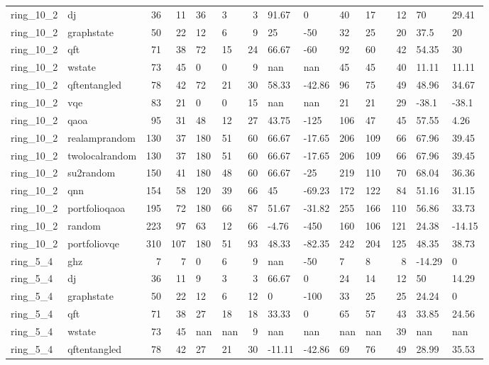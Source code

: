 \begin{longtable}{llrrllrllllrll}
ring\_10\_2 & dj & 36 & 11 & 36 & 3 & 3 & 91.67 & 0 & 40 & 17 & 12 & 70 & 29.41 \\
ring\_10\_2 & graphstate & 50 & 22 & 12 & 6 & 9 & 25 & -50 & 32 & 25 & 20 & 37.5 & 20 \\
ring\_10\_2 & qft & 71 & 38 & 72 & 15 & 24 & 66.67 & -60 & 92 & 60 & 42 & 54.35 & 30 \\
ring\_10\_2 & wstate & 73 & 45 & 0 & 0 & 9 & nan & nan & 45 & 45 & 40 & 11.11 & 11.11 \\
ring\_10\_2 & qftentangled & 78 & 42 & 72 & 21 & 30 & 58.33 & -42.86 & 96 & 75 & 49 & 48.96 & 34.67 \\
ring\_10\_2 & vqe & 83 & 21 & 0 & 0 & 15 & nan & nan & 21 & 21 & 29 & -38.1 & -38.1 \\
ring\_10\_2 & qaoa & 95 & 31 & 48 & 12 & 27 & 43.75 & -125 & 106 & 47 & 45 & 57.55 & 4.26 \\
ring\_10\_2 & realamprandom & 130 & 37 & 180 & 51 & 60 & 66.67 & -17.65 & 206 & 109 & 66 & 67.96 & 39.45 \\
ring\_10\_2 & twolocalrandom & 130 & 37 & 180 & 51 & 60 & 66.67 & -17.65 & 206 & 109 & 66 & 67.96 & 39.45 \\
ring\_10\_2 & su2random & 150 & 41 & 180 & 48 & 60 & 66.67 & -25 & 219 & 110 & 70 & 68.04 & 36.36 \\
ring\_10\_2 & qnn & 154 & 58 & 120 & 39 & 66 & 45 & -69.23 & 172 & 122 & 84 & 51.16 & 31.15 \\
ring\_10\_2 & portfolioqaoa & 195 & 72 & 180 & 66 & 87 & 51.67 & -31.82 & 255 & 166 & 110 & 56.86 & 33.73 \\
ring\_10\_2 & random & 223 & 97 & 63 & 12 & 66 & -4.76 & -450 & 160 & 106 & 121 & 24.38 & -14.15 \\
ring\_10\_2 & portfoliovqe & 310 & 107 & 180 & 51 & 93 & 48.33 & -82.35 & 242 & 204 & 125 & 48.35 & 38.73 \\
ring\_5\_4 & ghz & 7 & 7 & 0 & 6 & 9 & nan & -50 & 7 & 8 & 8 & -14.29 & 0 \\
ring\_5\_4 & dj & 36 & 11 & 9 & 3 & 3 & 66.67 & 0 & 24 & 14 & 12 & 50 & 14.29 \\
ring\_5\_4 & graphstate & 50 & 22 & 12 & 6 & 12 & 0 & -100 & 33 & 25 & 25 & 24.24 & 0 \\
ring\_5\_4 & qft & 71 & 38 & 27 & 18 & 18 & 33.33 & 0 & 65 & 57 & 43 & 33.85 & 24.56 \\
ring\_5\_4 & wstate & 73 & 45 & nan & nan & 9 & nan & nan & nan & nan & 39 & nan & nan \\
ring\_5\_4 & qftentangled & 78 & 42 & 27 & 21 & 30 & -11.11 & -42.86 & 69 & 76 & 49 & 28.99 & 35.53 \\

\end{longtable}
